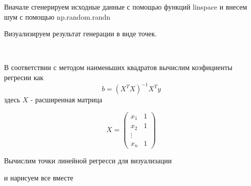 \documentclass{article}
\begin{document}
Вначале сгенерируем исходные данные с помощью функций linspace и внесем
шум с помощью np.random.randn

    Визуализируем результат генерации в виде точек.

    \begin{center}
    \end{center}
    { \hspace*{\fill} \\}
    
    В соответствии с методом наименьших квадратов вычислим коэфициенты
регресии как \[
    b = (X^T X)^{-1}X^T y
\] здесь \(X\) - расширенная матрица

\[
    X = \begin{pmatrix}
        x_1 & 1 \\
        x_2 & 1 \\
        \vdots \\
        x_n & 1
    \end{pmatrix}
\]

    Вычислим точки линейной регресси для визуализации

    и нарисуем все вместе

    \begin{center}
    \end{center}
    { \hspace*{\fill} \\}
    

    
    
    
    
\end{document}
